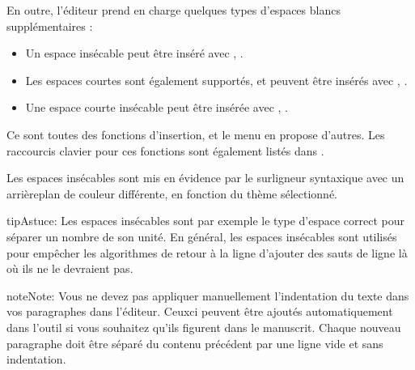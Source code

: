 \documentclass[a4paper,11pt,french]{sphinxmanual}
\begin{document}
\sphinxAtStartPar
En outre, l’éditeur prend en charge quelques types d’espaces blancs supplémentaires :
\begin{itemize}
\item {} 
\sphinxAtStartPar
Un espace insécable peut être inséré avec , .

\item {} 
\sphinxAtStartPar
Les espaces courtes sont également supportés, et peuvent être insérés avec , .

\item {} 
\sphinxAtStartPar
Une espace courte insécable peut être insérée avec , .

\end{itemize}

\sphinxAtStartPar
Ce sont toutes des fonctions d’insertion, et le menu  en propose d’autres. Les raccourcis clavier pour ces fonctions sont également listés dans {\hyperref[\detokenize{usage_shortcuts:a-kb-ins}]{}}.

\sphinxAtStartPar
Les espaces insécables sont mis en évidence par le surligneur syntaxique avec un arrière\sphinxhyphen{}plan de couleur différente, en fonction du thème sélectionné.

\begin{sphinxadmonition}{tip}{Astuce:}
\sphinxAtStartPar
Les espaces insécables sont par exemple le type d’espace correct pour séparer un nombre de son unité. En général, les espaces insécables sont utilisés pour empêcher les algorithmes de retour à la ligne d’ajouter des sauts de ligne là où ils ne le devraient pas.
\end{sphinxadmonition}

\begin{sphinxadmonition}{note}{Note:}
\sphinxAtStartPar
Vous ne devez pas appliquer manuellement l’indentation du texte dans vos paragraphes dans l’éditeur. Ceux\sphinxhyphen{}ci peuvent être ajoutés automatiquement dans l’outil  si vous souhaitez qu’ils figurent dans le manuscrit. Chaque nouveau paragraphe doit être séparé du contenu précédent par une ligne vide et sans indentation.
\end{sphinxadmonition}
\end{document}
